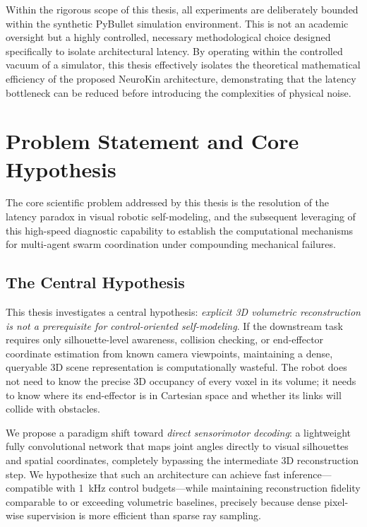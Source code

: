 \documentclass[12pt,a4paper,oneside]{report}
\begin{document}
Within the rigorous scope of this thesis, all experiments are deliberately bounded within the synthetic PyBullet simulation environment. This is not an academic oversight but a highly controlled, necessary methodological choice designed specifically to isolate architectural latency. By operating within the controlled vacuum of a simulator, this thesis effectively isolates the theoretical mathematical efficiency of the proposed NeuroKin architecture, demonstrating that the latency bottleneck can be reduced before introducing the complexities of physical noise.
\section{Problem Statement and Core Hypothesis}
\label{sec:problem_hypothesis}

The core scientific problem addressed by this thesis is the resolution of the latency paradox in visual robotic self-modeling, and the subsequent leveraging of this high-speed diagnostic capability to establish the computational mechanisms for multi-agent swarm coordination under compounding mechanical failures.
\subsection{The Central Hypothesis}
\label{subsec:central_hypothesis}

This thesis investigates a central hypothesis: \textit{explicit 3D volumetric reconstruction is not a prerequisite for control-oriented self-modeling}. If the downstream task requires only silhouette-level awareness, collision checking, or end-effector coordinate estimation from known camera viewpoints, maintaining a dense, queryable 3D scene representation is computationally wasteful. The robot does not need to know the precise 3D occupancy of every voxel in its volume; it needs to know where its end-effector is in Cartesian space and whether its links will collide with obstacles.

We propose a paradigm shift toward \textit{direct sensorimotor decoding}: a lightweight fully convolutional network that maps joint angles directly to visual silhouettes and spatial coordinates, completely bypassing the intermediate 3D reconstruction step. We hypothesize that such an architecture can achieve fast inference---compatible with 1~kHz control budgets---while maintaining reconstruction fidelity comparable to or exceeding volumetric baselines, precisely because dense pixel-wise supervision is more efficient than sparse ray sampling.
\end{document}
